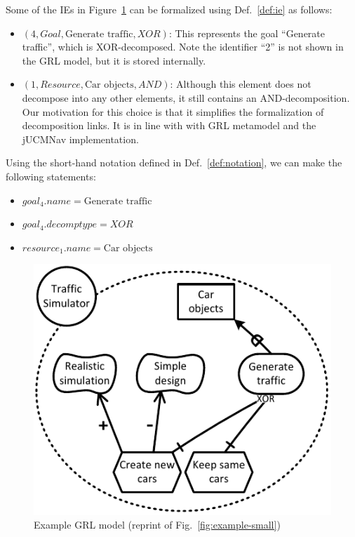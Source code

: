 Some of the IEs in Figure~\ref{fig:example-small2} can be formalized using Def.~\ref{def:ie} as follows:
\begin{itemize}
\item $(4, Goal, \text{Generate traffic}, XOR)$: This represents the goal ``Generate traffic'', which is XOR-decomposed. Note the identifier ``2'' is not shown in the GRL model, but it is stored internally.
\item $(1, Resource, \text{Car objects}, AND)$: Although this element does not decompose into any other elements, it still contains an AND-decomposition. Our motivation for this choice is that it simplifies the formalization of decomposition links. It is in line with with GRL metamodel and the jUCMNav implementation.
\end{itemize}

Using the short-hand notation defined in Def.~\ref{def:notation}, we can make the following statements:
\begin{itemize}
\item $goal_4.name = \text{Generate traffic}$
\item $goal_4.decomptype = XOR$
\item $resource_1.name = \text{Car objects}$
\end{itemize}

\begin{figure}[ht]
\centering
\includegraphics[width=\columnwidth]{img/Example1-new.pdf}
\caption{Example GRL model (reprint of Fig.~\ref{fig:example-small})}
\label{fig:example-small2}
\end{figure} 

